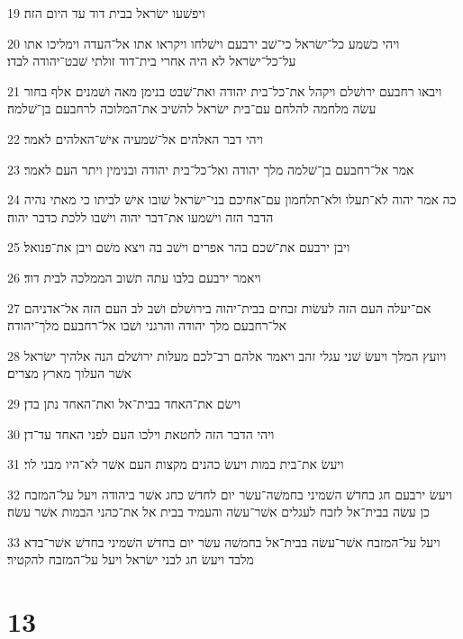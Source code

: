 \par 19 ויפשׁעו ישׂראל בבית דוד עד היום הזה׃
\par 20 ויהי כשׁמע כל־ישׂראל כי־שׁב ירבעם וישׁלחו ויקראו אתו אל־העדה וימליכו אתו על־כל־ישׂראל לא היה אחרי בית־דוד זולתי שׁבט־יהודה לבדו׃
\par 21 ויבאו רחבעם ירושׁלם ויקהל את־כל־בית יהודה ואת־שׁבט בנימן מאה ושׁמנים אלף בחור עשׂה מלחמה להלחם עם־בית ישׂראל להשׁיב את־המלוכה לרחבעם בן־שׁלמה׃
\par 22 ויהי דבר האלהים אל־שׁמעיה אישׁ־האלהים לאמר׃
\par 23 אמר אל־רחבעם בן־שׁלמה מלך יהודה ואל־כל־בית יהודה ובנימין ויתר העם לאמר׃
\par 24 כה אמר יהוה לא־תעלו ולא־תלחמון עם־אחיכם בני־ישׂראל שׁובו אישׁ לביתו כי מאתי נהיה הדבר הזה וישׁמעו את־דבר יהוה וישׁבו ללכת כדבר יהוה׃
\par 25 ויבן ירבעם את־שׁכם בהר אפרים וישׁב בה ויצא משׁם ויבן את־פנואל׃
\par 26 ויאמר ירבעם בלבו עתה תשׁוב הממלכה לבית דוד׃
\par 27 אם־יעלה העם הזה לעשׂות זבחים בבית־יהוה בירושׁלם ושׁב לב העם הזה אל־אדניהם אל־רחבעם מלך יהודה והרגני ושׁבו אל־רחבעם מלך־יהודה׃
\par 28 ויועץ המלך ויעשׂ שׁני עגלי זהב ויאמר אלהם רב־לכם מעלות ירושׁלם הנה אלהיך ישׂראל אשׁר העלוך מארץ מצרים׃
\par 29 וישׂם את־האחד בבית־אל ואת־האחד נתן בדן׃
\par 30 ויהי הדבר הזה לחטאת וילכו העם לפני האחד עד־דן׃
\par 31 ויעשׂ את־בית במות ויעשׂ כהנים מקצות העם אשׁר לא־היו מבני לוי׃
\par 32 ויעשׂ ירבעם חג בחדשׁ השׁמיני בחמשׁה־עשׂר יום לחדשׁ כחג אשׁר ביהודה ויעל על־המזבח כן עשׂה בבית־אל לזבח לעגלים אשׁר־עשׂה והעמיד בבית אל את־כהני הבמות אשׁר עשׂה׃
\par 33 ויעל על־המזבח אשׁר־עשׂה בבית־אל בחמשׁה עשׂר יום בחדשׁ השׁמיני בחדשׁ אשׁר־בדא מלבד ויעשׂ חג לבני ישׂראל ויעל על־המזבח להקטיר׃

\chapter{13}

